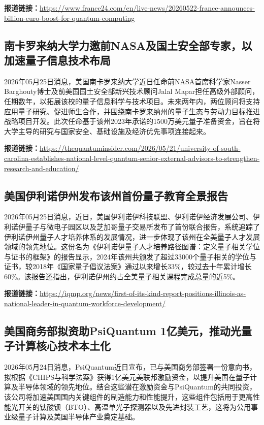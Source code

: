 \documentclass[12pt,a4paper]{ctexart}
\begin{document}
\noindent\textbf{报道链接：}\url{https://www.france24.com/en/live-news/20260522-france-announces-billion-euro-boost-for-quantum-computing}

\subsection{ 南卡罗来纳大学力邀前NASA及国土安全部专家，以加速量子信息技术布局 }

2026年05月25日消息，美国南卡罗来纳大学近日任命前NASA首席科学家Nasser Barghouty博士及前美国国土安全部新兴技术顾问Jalal Mapar担任高级外部顾问，任期数年，以拓展该校的量子信息科学与技术项目。未来两年内，两位顾问将支持应用量子研究、促进师生合作，并围绕南卡罗来纳州的量子生态与劳动力目标推进战略项目开发。此次任命基于该州2023年承诺的1500万美元量子准备资金，旨在将大学主导的研究与国家安全、基础设施及经济优先事项连接起来。

\noindent\textbf{报道链接：}\url{https://thequantuminsider.com/2026/05/21/university-of-south-carolina-establishes-national-level-quantum-senior-external-advisors-to-strengthen-research-and-education/}

\subsection{ 美国伊利诺伊州发布该州首份量子教育全景报告 }

2026年05月25日消息，近日，美国伊利诺伊科技联盟、伊利诺伊经济发展公司、伊利诺伊量子与微电子园区以及芝加哥量子交易所发布了首份联合报告，系统追踪了伊利诺伊州量子人才培养体系的发展情况，进一步体现了该州在全美量子人才发展领域的领先地位。这份名为《伊利诺伊量子人才培养路径图谱：定义量子相关学位与证书的框架》的报告显示，2024年该州共颁发了超过33000个量子相关的学位与证书，较2018年《国家量子倡议法案》通过以来增长33\%，较过去十年累计增长60\%。该报告还指出，伊利诺伊州约占全美量子相关课程完成总量的近5\%。

\noindent\textbf{报道链接：}\url{https://iqmp.org/news/first-of-its-kind-report-positions-illinois-as-national-leader-in-quantum-workforce-development/}

\subsection{ 美国商务部拟资助PsiQuantum 1亿美元，推动光量子计算核心技术本土化 }

2026年05月24日消息，PsiQuantum近日宣布，已与美国商务部签署一份意向书，拟根据《CHIPS与科学法案》获得1亿美元美联邦激励资金，以提升美国在量子计算及半导体领域的领先地位。结合这些潜在激励资金与PsiQuantum的共同投资，该公司将加速美国国内关键组件的制造能力和性能提升，这些组件包括用于更高性能光开关的钛酸钡（BTO）、高温单光子探测器以及先进封装工艺，这将为公用事业级量子计算及美国半导体产业奠定基础。
\end{document}
